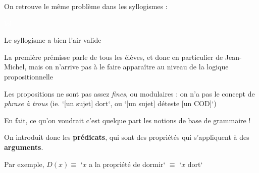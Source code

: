 \begin{frame}
	
	On retrouve le même problème dans les syllogismes :\newline
	
\pause
	\newline



\textcolor{white}{lol}

Le syllogisme a bien l'air valide\newline
\pause

La première prémisse parle de tous les élèves, et donc en particulier de Jean-Michel, mais on n'arrive pas à le faire apparaître au niveau de la logique propositionnelle

\end{frame}



\begin{frame}
	
	Les propositions ne sont pas assez \textit{fines}, ou modulaires : on n'a pas le concept de \textit{phrase à trous} (ie. `[un sujet] dort`, ou `[un sujet] déteste [un COD]`)\newline
	
	En fait, ce qu'on voudrait c'est quelque part les notions de base de grammaire !\pause\newline
	
	On introduit donc les \textbf{prédicats}, qui sont des propriétés qui s'appliquent à des \textbf{arguments}. \newline

 Par exemple, $D(x) \equiv $ `$x$ a la propriété de dormir` $\equiv$ `$x$ dort`
	
	

\end{frame}



